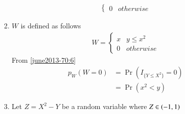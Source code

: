 \begin{enumerate}
\begin{enumerate}
\begin{align}
\begin{cases}
    0 & otherwise 
\end{cases} \label{june2013-70:5}
\end{align}
\item $W$ is defined as follows
\begin{align}
W  = 
\begin{cases}
    x & y \leq x^2 \\
    0 & otherwise
\end{cases}  \label{june2013-70:6}
\end{align}
From \eqref{june2013-70:6}
\begin{align}
p_W(W=0) &= \Pr(I_{\{Y\leq X^2\}}=0) \\
         &=\Pr(x^2 <y) \label{june2013-70:7}
\end{align}
\item Let $Z=X^2-Y$ be a random variable where $Z \in \left(-1,1\right)$


\end{enumerate}
\end{enumerate}
